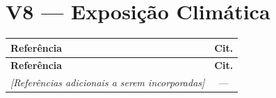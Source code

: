 \documentclass[a4paper,11pt]{article}
\begin{document}
\section{V8 --- Exposição Climática}

\begin{longtable}{>{\raggedright\arraybackslash}p{} c}
\toprule
\textbf{Referência} & \textbf{Cit.} \\
\midrule
\endfirsthead
\toprule
\textbf{Referência} & \textbf{Cit.} \\
\midrule
\endhead

\textit{[Referências adicionais a serem incorporadas]} & --- \\

\bottomrule
\end{longtable}
\end{document}
